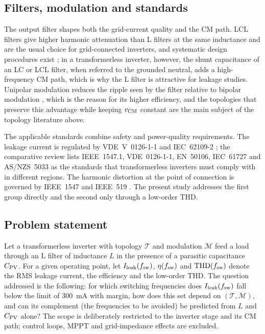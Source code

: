 \subsection{Filters, modulation and standards}
The output filter shapes both the grid-current quality and the CM path. LCL filters give higher harmonic attenuation than L filters at the same inductance and are the usual choice for grid-connected inverters, and systematic design procedures exist \cite{Reznik2014}; in a transformerless inverter, however, the shunt capacitance of an LC or LCL filter, when referred to the grounded neutral, adds a high-frequency CM path, which is why the L filter is attractive for leakage studies. Unipolar modulation reduces the ripple seen by the filter relative to bipolar modulation \cite{Gonzalez2007,Salem2021}, which is the reason for its higher efficiency, and the topologies that preserve this advantage while keeping $v_{\mathrm{CM}}$ constant are the main subject of the topology literature above.

The applicable standards combine safety and power-quality requirements. The leakage current is regulated by VDE~V~0126-1-1 and IEC~62109-2 \cite{VDE0126,IEC62109}; the comparative review \cite{Khan2020} lists IEEE~1547.1, VDE~0126-1-1, EN~50106, IEC~61727 and AS/NZS~5033 as the standards that transformerless inverters must comply with in different regions. The harmonic distortion at the point of connection is governed by IEEE~1547 and IEEE~519 \cite{IEEE1547,IEEE519}. The present study addresses the first group directly and the second only through a low-order THD.

\subsection{Problem statement}
Let a transformerless inverter with topology $\mathcal{T}$ and modulation $\mathcal{M}$ feed a load through an L filter of inductance $L$ in the presence of a parasitic capacitance $C_{\mathrm{PV}}$. For a given operating point, let $I_{\mathrm{leak}}(f_{\mathrm{sw}})$, $\eta(f_{\mathrm{sw}})$ and $\mathrm{THD}(f_{\mathrm{sw}})$ denote the RMS leakage current, the efficiency and the low-order THD. The question addressed is the following: for which switching frequencies does $I_{\mathrm{leak}}(f_{\mathrm{sw}})$ fall below the limit of 300~mA with margin, how does this set depend on $(\mathcal{T},\mathcal{M})$, and can its complement (the frequencies to be avoided) be predicted from $L$ and $C_{\mathrm{PV}}$ alone? The scope is deliberately restricted to the inverter stage and its CM path; control loops, MPPT and grid-impedance effects are excluded.
